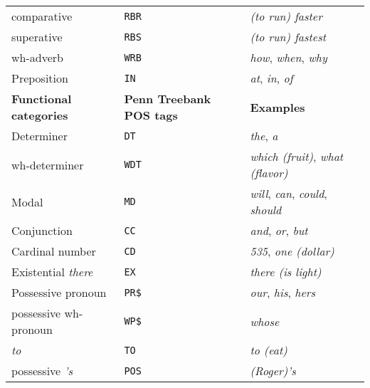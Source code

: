 \documentclass[letterpaper, 10pt]{article}
\begin{document}
\begin{table}[H]
\begin{tabular}{lll}
\quad{}comparative			& \texttt{RBR}						& \textit{(to run) faster}\\
\quad{}superative			& \texttt{RBS}						& \textit{(to run) fastest}\\
\quad{}wh-adverb				& \texttt{WRB}						& \textit{how}, \textit{when}, \textit{why}\\
Preposition				& \texttt{IN}						& \textit{at}, \textit{in}, \textit{of}\\
\midrule
\textbf{Functional categories}		& \textbf{Penn Treebank POS tags}		& \textbf{Examples}\\
\midrule
Determiner				& \texttt{DT}						& \textit{the}, \textit{a}\\
\quad{}wh-determiner				& \texttt{WDT}						& \textit{which (fruit)}, \textit{what (flavor)}\\
Modal					& \texttt{MD}						& \textit{will}, \textit{can}, \textit{could}, \textit{should}\\
Conjunction				& \texttt{CC}						& \textit{and}, \textit{or}, \textit{but}\\
Cardinal number			& \texttt{CD}						& \textit{535}, \textit{one (dollar)}\\
Existential \textit{there}		& \texttt{EX}						& \textit{there (is light)}\\
Possessive pronoun			& \texttt{PR\$}						& \textit{our}, \textit{his}, \textit{hers}\\
\quad{}possessive wh-pronoun		& \texttt{WP\$}						& \textit{whose}\\
\textit{to}					& \texttt{TO}						& \textit{to (eat)}\\
possessive \textit{'s}			& \texttt{POS}						& \textit{(Roger)'s}\\

\bottomrule
\end{tabular}
\end{table}
\end{document}
